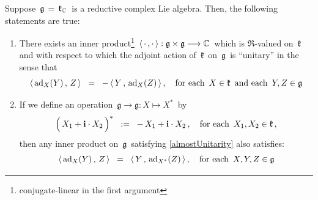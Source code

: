\vskip 0.5cm
\begin{proposition}
\label{ReductiveImpliesUnitaryInnerProductOnRealForm}
\mbox{}
\vskip 0.1cm
\noindent
Suppose \,$\mathfrak{g} \,=\, \mathfrak{k}_{\mathbb{C}}$\, is a reductive complex Lie algebra.
Then, the following statements are true:
\begin{enumerate}
\item
    There exists an inner product\footnote{conjugate-linear in the first argument}
    \,$\langle\,\cdot\,,\cdot\,\rangle : \mathfrak{g} \times \mathfrak{g} \longrightarrow \mathbb{C}$\,
    which is $\Re$-valued on \,$\mathfrak{k}$\, and with respect to which the adjoint action of
    \,$\mathfrak{k}$\, on \,$\mathfrak{g}$\,
    is ``unitary'' in the sense that
    \begin{equation}\label{almostUnitarity}
    \langle\,\textnormal{ad}_{X}(Y)\,,\,Z\,\rangle
    \;\; = \;\;
        -\,\langle\,Y\,,\,\textnormal{ad}_{X}(Z)\,\rangle\,,
    \quad
    \textnormal{for each \,$X \in \mathfrak{k}$\, and each \,$Y,Z \in \mathfrak{g}$}
    \end{equation}
\item
    If we define an operation
    \,$\mathfrak{g} \longrightarrow \mathfrak{g} : X \longmapsto X^{*}$\,
    by
    \begin{equation*}
    \left(\,\overset{{\color{white}.}}{X_{1} + \i\cdot X_{2}}\,\right)^{*}
    \;\; := \;\;
        -\,X_{1} + \i\cdot X_{2}\,,
    \quad
    \textnormal{for each \,$X_{1}, X_{2} \in \mathfrak{k}$}\,,
    \end{equation*}
    then any inner product on \,$\mathfrak{g}$\, satisfying \eqref{almostUnitarity}
    also satisfies:
    \begin{equation}
    \langle\,\textnormal{ad}_{X}(Y)\,,\,Z\,\rangle
    \;\; = \;\;
        \langle\,Y\,,\,\textnormal{ad}_{X^{*}}(Z)\,\rangle\,,
    \quad
    \textnormal{for each \,$X,Y,Z \in \mathfrak{g}$}
    \end{equation}
\end{enumerate}
\end{proposition}
\proof
